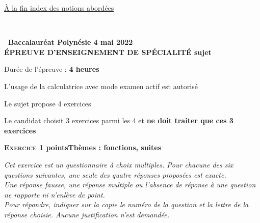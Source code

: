 \documentclass[10pt,a4paper]{article}
\begin{document}
\hyperlink{Index}{À la fin index des notions abordées}

\newpage ~
\newpage
\hypertarget{Polynesie1}{}

\label{Polynesie1}

\pagestyle{fancy}
\thispagestyle{empty}

\begin{center}{\Large\textbf{\decofourleft~Baccalauréat Polynésie 4 mai 2022~\decofourright\\[6pt] ÉPREUVE D'ENSEIGNEMENT DE SPÉCIALITÉ sujet }}

\bigskip

Durée de l'épreuve : \textbf{4 heures}

\medskip

L'usage de la calculatrice avec mode examen actif est autorisé

\medskip

Le sujet propose 4 exercices

Le candidat choisit 3 exercices parmi les 4 et \textbf{ne doit traiter que ces 3 exercices}
\end{center}

\bigskip

\textbf{\textsc{Exercice 1}  points\hfill Thèmes : fonctions, suites}

\medskip

\emph{Cet exercice est un questionnaire à choix multiples. Pour chacune des six questions suivantes, une seule des quatre réponses proposées est exacte.\\
Une réponse fausse, une réponse multiple ou l'absence de réponse à une question ne rapporte ni n'enlève de point.\\
Pour répondre, indiquer sur la copie le numéro de la question et la lettre de la réponse choisie. Aucune justification n'est demandée.}

\medskip
\end{document}
